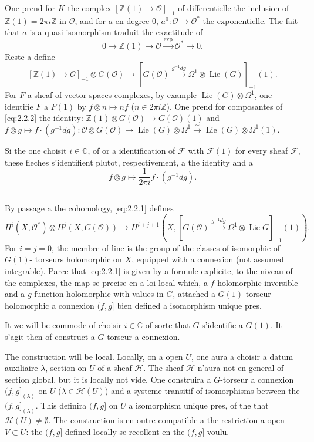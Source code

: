 \documentclass[12pt,a4paper]{article}
\theoremstyle{plain}
\theoremstyle{definition}
\theoremstyle{remark}
\newcommand{\cO}{\mathcal{O}}
\newcommand{\cH}{\mathcal{H}}
\newcommand{\cF}{\mathcal{F}}
\newcommand{\Z}{\mathbb{Z}}
\newcommand{\C}{\mathbb{C}}
\providecommand{\cF}{\mathcal{F}}
\providecommand{\cH}{\mathcal{H}}
\providecommand{\cO}{\mathcal{O}}
\begin{document}
One prend for $K$ the complex $[\Z(1) \to \cO]_{-1}$ of differentielle the inclusion of
$\Z(1) = 2\pi i\Z$ in $\cO$, and for $a$ en degree $0$, $a^0 : \cO \to \cO^*$ the exponentielle. The fait that $a$
is a quasi-isomorphism traduit the exactitude of
\[
0 \to \Z(1) \to \cO \xrightarrow{\exp} \cO^* \to 0.
\]
Reste a define
\begin{equation}\label{eq:2.2.2}
[\Z(1) \to \cO]_{-1} \otimes G(\cO) \to [G(\cO) \xrightarrow{g^{-1}dg} \Omega^1 \otimes \operatorname{Lie}(G)]_{-1}(1).
\end{equation}
For $F$ a sheaf of vector spaces complexes, by example $\operatorname{Lie}(G) \otimes \Omega^1$, one identifie
$F$ a $F(1)$ by $f \otimes n \mapsto nf$ ($n \in 2\pi i\Z$). One prend for composantes of \eqref{eq:2.2.2}
the identity: $\Z(1) \otimes G(\cO) \to G(\cO)(1)$
and
$f \otimes g \mapsto f \cdot (g^{-1}dg) : \cO \otimes G(\cO) \to \operatorname{Lie}(G) \otimes \Omega^1 \xrightarrow{\sim} \operatorname{Lie}(G) \otimes \Omega^1(1)$.

Si the one choisit $i \in \C$, of or a identification of $\cF$ with $\cF(1)$ for every sheaf $\cF$,
these fleches s'identifient plutot, respectivement, a the identity and a
\[
f \otimes g \mapsto \frac{1}{2\pi i} f \cdot (g^{-1}dg).
\]

\subsection{}

By passage a the cohomology, \eqref{eq:2.2.1} defines
\[
H^i(X, \cO^*) \otimes H^j(X, G(\cO)) \to H^{i+j+1}(X, [G(\cO) \xrightarrow{g^{-1}dg} \Omega^1 \otimes \operatorname{Lie} G]_{-1}(1)).
\]
For $i = j = 0$, the membre of line is the group of the classes of isomorphie of $G(1)$-
torseurs holomorphic on $X$, equipped with a connexion (not assumed integrable). Parce
that \eqref{eq:2.2.1} is given by a formule explicite, to the niveau of the complexes, the map
se precise en a loi local which, a $f$ holomorphic inversible and a $g$ function holomorphic
with values in $G$, attached a $G(1)$-torseur holomorphic a connexion $(f,g]$ bien defined
a isomorphism unique pres.

It we will be commode of choisir $i \in \C$ of sorte that $G$ s'identifie a $G(1)$. It s'agit
then of construct a $G$-torseur a connexion.

The construction will be local. Locally, on a open $U$, one aura a choisir a datum auxiliaire $\lambda$, section on $U$ of a sheaf $\cH$. The sheaf $\cH$ n'aura not en
general of section global, but it is locally not vide. One construira a $G$-torseur a connexion $(f,g]_{(\lambda)}$ on $U$ ($\lambda \in \cH(U)$) and a systeme transitif of isomorphisms between the $(f,g]_{(\lambda)}$.
This definira $(f,g]$ on $U$ a isomorphism unique pres, of the that $\cH(U) \neq \emptyset$. The
construction is en outre compatible a the restriction a open $V \subset U$: the $(f,g]$ defined
locally se recollent en the $(f,g]$ voulu.
\end{document}
